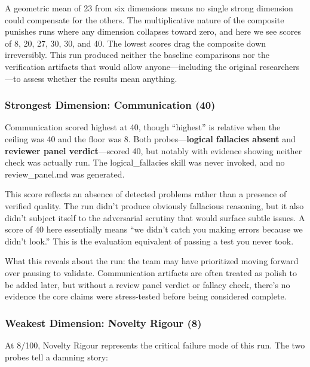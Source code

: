 \documentclass[10pt,letterpaper]{article}
\begin{document}
A geometric mean of 23 from six dimensions means no single strong dimension could compensate for the others. The multiplicative nature of the composite punishes runs where any dimension collapses toward zero, and here we see scores of 8, 20, 27, 30, 30, and 40. The lowest scores drag the composite down irreversibly. This run produced neither the baseline comparisons nor the verification artifacts that would allow anyone---including the original researchers---to assess whether the results mean anything.

\hypertarget{strongest-dimension-communication-40}{%
\subsubsection{Strongest Dimension: Communication (40)}\label{strongest-dimension-communication-40}}

Communication scored highest at 40, though ``highest'' is relative when the ceiling was 40 and the floor was 8. Both probes---\textbf{logical fallacies absent} and \textbf{reviewer panel verdict}---scored 40, but notably with evidence showing neither check was actually run. The logical\_fallacies skill was never invoked, and no review\_panel.md was generated.

This score reflects an absence of detected problems rather than a presence of verified quality. The run didn't produce obviously fallacious reasoning, but it also didn't subject itself to the adversarial scrutiny that would surface subtle issues. A score of 40 here essentially means ``we didn't catch you making errors because we didn't look.'' This is the evaluation equivalent of passing a test you never took.

What this reveals about the run: the team may have prioritized moving forward over pausing to validate. Communication artifacts are often treated as polish to be added later, but without a review panel verdict or fallacy check, there's no evidence the core claims were stress-tested before being considered complete.

\hypertarget{weakest-dimension-novelty-rigour-8}{%
\subsubsection{Weakest Dimension: Novelty Rigour (8)}\label{weakest-dimension-novelty-rigour-8}}

At 8/100, Novelty Rigour represents the critical failure mode of this run. The two probes tell a damning story:
\end{document}
